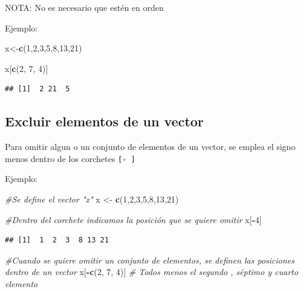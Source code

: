 \documentclass[
]{book}
\newenvironment{Shaded}{\begin{snugshade}}{\end{snugshade}}
\newcommand{\CommentTok}[1]{\textcolor[rgb]{0.56,0.35,0.01}{\textit{#1}}}
\newcommand{\DecValTok}[1]{\textcolor[rgb]{0.00,0.00,0.81}{#1}}
\newcommand{\FunctionTok}[1]{\textcolor[rgb]{0.13,0.29,0.53}{\textbf{#1}}}
\newcommand{\NormalTok}[1]{#1}
\newcommand{\OtherTok}[1]{\textcolor[rgb]{0.56,0.35,0.01}{#1}}
\newcommand{\SpecialCharTok}[1]{\textcolor[rgb]{0.81,0.36,0.00}{\textbf{#1}}}
\begin{document}
NOTA: No es necesario que estén en orden

Ejemplo:

\begin{Shaded}
\begin{Highlighting}[]
\NormalTok{x}\OtherTok{\textless{}{-}}\FunctionTok{c}\NormalTok{(}\DecValTok{1}\NormalTok{,}\DecValTok{2}\NormalTok{,}\DecValTok{3}\NormalTok{,}\DecValTok{5}\NormalTok{,}\DecValTok{8}\NormalTok{,}\DecValTok{13}\NormalTok{,}\DecValTok{21}\NormalTok{)}

\NormalTok{x[}\FunctionTok{c}\NormalTok{(}\DecValTok{2}\NormalTok{, }\DecValTok{7}\NormalTok{, }\DecValTok{4}\NormalTok{)]}
\end{Highlighting}
\end{Shaded}

\begin{verbatim}
## [1]  2 21  5
\end{verbatim}

\subsection{Excluir elementos de un vector}\label{excluir-elementos-de-un-vector}

Para omitir algun o un conjunto de elementos de un vector, se emplea el signo menos dentro de los corchetes \texttt{{[}-\ {]}}

Ejemplo:

\begin{Shaded}
\begin{Highlighting}[]
\CommentTok{\#Se define el vector "x"}
\NormalTok{x }\OtherTok{\textless{}{-}} \FunctionTok{c}\NormalTok{(}\DecValTok{1}\NormalTok{,}\DecValTok{2}\NormalTok{,}\DecValTok{3}\NormalTok{,}\DecValTok{5}\NormalTok{,}\DecValTok{8}\NormalTok{,}\DecValTok{13}\NormalTok{,}\DecValTok{21}\NormalTok{)}

\CommentTok{\#Dentro del corchete indicamos la posición que se quiere omitir }
\NormalTok{x[}\SpecialCharTok{{-}}\DecValTok{4}\NormalTok{]}
\end{Highlighting}
\end{Shaded}

\begin{verbatim}
## [1]  1  2  3  8 13 21
\end{verbatim}

\begin{Shaded}
\begin{Highlighting}[]
\CommentTok{\#Cuando se quiere omitir un conjunto de elementos, se definen las posiciones dentro de un vector}
\NormalTok{x[}\SpecialCharTok{{-}}\FunctionTok{c}\NormalTok{(}\DecValTok{2}\NormalTok{, }\DecValTok{7}\NormalTok{, }\DecValTok{4}\NormalTok{)]   }\CommentTok{\# Todos menos el segundo , séptimo y cuarto elemento}
\end{Highlighting}
\end{Shaded}
\end{document}
